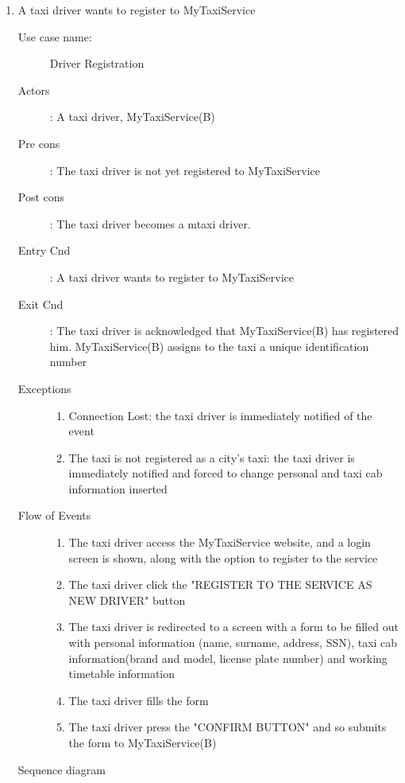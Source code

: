 \documentclass[11pt,titlepage]{article} %
\begin{document}
\begin{enumerate}
	
	      \item A taxi driver wants to register to MyTaxiService
		\begin{description}
		        \item [Use case name:] Driver Registration
		        \item [Actors]: A taxi driver, MyTaxiService(B)
		        \item [Pre cons]: The taxi driver is not yet registered to MyTaxiService
		        \item [Post cons]: The taxi driver becomes a mtaxi driver.
		        \item [Entry Cnd]: A taxi driver wants to register to MyTaxiService
		        \item [Exit Cnd]: The taxi driver is acknowledged that MyTaxiService(B) has registered him. MyTaxiService(B)
		        assigns to the taxi a unique identification number
		        \item [Exceptions] \hfill
			\begin{enumerate}
			          \item Connection Lost: the taxi driver is immediately notified of the event
			          \item The taxi is not registered as a city's taxi: the taxi driver is immediately notified
			          and forced to change personal and taxi cab information inserted
			\end{enumerate}
		        \item [Flow of Events]\hfill
			\begin{enumerate}
			          \item The taxi driver access the MyTaxiService website, and a login
			            screen is shown, along with the option to register to the service
			          \item The taxi driver click the "REGISTER TO THE SERVICE AS NEW DRIVER" button
			          \item The taxi driver is redirected to a screen with a form to be filled out with personal information (name, surname, address, SSN),
			           taxi cab information(brand and model, license plate number) and working timetable information
			          \item The taxi driver fills the form
			          \item The taxi driver press the "CONFIRM BUTTON" and so submits the form to MyTaxiService(B)
			\end{enumerate}
		\end{description}
		Sequence diagram

\end{enumerate}
\end{document}
